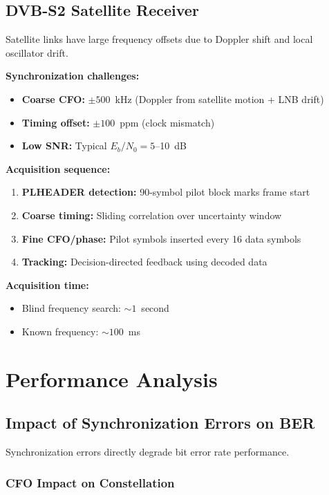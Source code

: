 \subsection{DVB-S2 Satellite Receiver}

Satellite links have large frequency offsets due to Doppler shift and local oscillator drift.

\textbf{Synchronization challenges:}
\begin{itemize}
\item \textbf{Coarse CFO:} $\pm 500$~kHz (Doppler from satellite motion + LNB drift)
\item \textbf{Timing offset:} $\pm 100$~ppm (clock mismatch)
\item \textbf{Low SNR:} Typical $E_b/N_0 = 5$--10~dB
\end{itemize}

\textbf{Acquisition sequence:}
\begin{enumerate}
\item \textbf{PLHEADER detection:} 90-symbol pilot block marks frame start
\item \textbf{Coarse timing:} Sliding correlation over uncertainty window
\item \textbf{Fine CFO/phase:} Pilot symbols inserted every 16 data symbols
\item \textbf{Tracking:} Decision-directed feedback using decoded data
\end{enumerate}

\textbf{Acquisition time:}
\begin{itemize}
\item Blind frequency search: $\sim 1$~second
\item Known frequency: $\sim 100$~ms
\end{itemize}

\section{Performance Analysis}

\subsection{Impact of Synchronization Errors on BER}

Synchronization errors directly degrade bit error rate performance.

\subsubsection{CFO Impact on Constellation}


